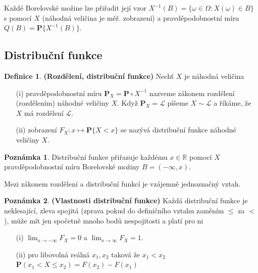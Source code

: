 \documentclass[a4]{report}
\theoremstyle{definition}
\newtheorem{definition}{Definice}[section]
\newtheorem{remark}{Poznámka}[section]
\begin{document}
{Každé Borelovské možine lze přiřadit její vzor $X^{-1}(B) = \lbrace \omega \in \Omega : X(\omega) \in B \rbrace$ s pomocí $X$ (náhodná veličina je měř. zobrazení) a pravděpodobnostní míru $Q(B) = \textbf{P}\lbrace X^{-1}(B) \rbrace$.



\subsection{Distribuční funkce}
\begin{definition}{\textbf{(Rozdělení, distribuční funkce)}}
Nechť $X$ je náhodná veličina
\begin{itemize}
\item[(i)] pravděpodobnostní míru $\textbf{P}_{X} = \textbf{P} \circ X^{-1}$ nazveme zákonem rozdělení (rozdělením) náhodné veličiny $X$. Když $\textbf{P}_{X} = \mathcal{L}$ píšeme $X \sim \mathcal{L}$ a říkáme, že $X$ má rozdělení $\mathcal{L}$.
\item[(ii)] zobrazení $F_{X}: x \mapsto \textbf{P}\lbrace X < x \rbrace$ se nazývá distribuční funkce náhodné veličiny $X$.
\end{itemize}
\end{definition}
\begin{remark}
Distribuční funkce přiřazuje každému $x \in \mathbb{R}$ pomocí $X$ pravděpodobnostní míru Borelovské možiny $B = ( -\infty, x)$. 

Mezi zákonem rozdělení a distribuční funkcí je vzájemně jednoznačný vztah.
\end{remark}
\begin{remark}{\textbf{(Vlastnosti distribuční funkce)}}
Každá distribuční funkce je neklesající, zleva spojitá (zprava pokud do definičního vztahu zaměním $\leq$ za $<$), může mít jen spočetně mnoho bodů nespojitosti a platí pro ni
\begin{itemize}
\item[(i)] $\lim_{x \longrightarrow -\infty}F_{X} = 0$ a $\lim_{x \longrightarrow \infty}F_{X} = 1$.
\item[(ii)]pro libovolná reálná $x_{1}, x_{2}$ taková že $x_{1} < x_{2}$ $\textbf{P}(x_{1} < X \leq x_{2}) = F(x_{2}) - F(x_{1})$
\end{itemize} 
\end{remark}

}
\end{document}
